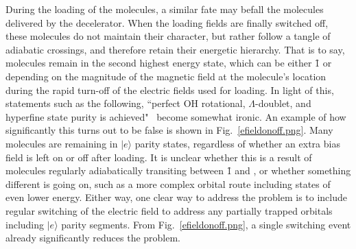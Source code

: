
During the loading of the molecules, a similar fate may befall the  molecules delivered by the decelerator.
When the loading fields are finally switched off, these molecules do not maintain their  character, but rather follow a tangle of adiabatic crossings, and therefore retain their energetic hierarchy.
That is to say,  molecules remain in the second highest energy state, which can be either \f1 or  depending on the magnitude of the magnetic field at the molecule's location during the rapid turn-off of the electric fields used for loading.
In light of this, statements such as the following, ``perfect OH rotational, $\Lambda$-doublet, and hyperfine state purity is achieved"~\citep[Page.~19061, Top Right]{Sawyer2011} become somewhat ironic.
An example of how significantly this turns out to be false is shown in Fig.~\ref{efieldonoff.png}.
Many molecules are remaining in $|e\rangle$ parity states, regardless of whether an extra bias field is left on or off after loading.
It is unclear whether this is a result of molecules regularly adiabatically transiting between \f1 and , or whether something different is going on, such as a more complex orbital route including states of even lower energy.
Either way, one clear way to address the problem is to include regular switching of the electric field to address any partially trapped orbitals including $|e\rangle$ parity segments.
From Fig.~\ref{efieldonoff.png}, a single switching event already significantly reduces the problem.


